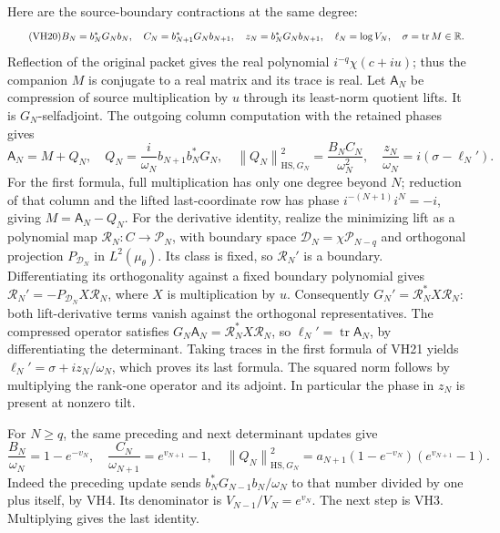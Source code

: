 \documentclass[11pt]{article}
\newcommand{\tr}{\operatorname{tr}}\newcommand{\norm}[1]{\left\lVert#1\right\rVert}
\begin{document}
Here are the source-boundary contractions at the same degree:
\begin{equation}\tag{VH20}\label{VH20}
B_N=b_N^*G_Nb_N,\quad C_N=b_{N+1}^*G_Nb_{N+1},\quad
z_N=b_N^*G_Nb_{N+1},\quad
\ell_N=\log V_N,\quad \sigma=\tr M\in\R.
\end{equation}
Reflection of the original packet gives the real polynomial
\(i^{-q}\chi(c+iu)\); thus the companion \(M\) is conjugate to a real
matrix and its trace is real. Let \(\mathsf A_N\) be compression of
source multiplication by \(u\) through its least-norm quotient lifts.
It is \(G_N\)-selfadjoint. The outgoing column computation with the
retained phases gives
\begin{equation}\tag{VH21}\label{VH21}
\mathsf A_N=M+Q_N,\quad
Q_N=\frac{i}{\omega_N}b_{N+1}b_N^*G_N,\quad
\norm{Q_N}_{\mathrm{HS},G_N}^2=\frac{B_NC_N}{\omega_N^2},\quad
\frac{z_N}{\omega_N}=i(\sigma-\ell_N').
\end{equation}
For the first formula, full multiplication has only one degree beyond
\(N\); reduction of that column and the lifted last-coordinate row
has phase \(i^{-(N+1)}i^N=-i\), giving \(M=\mathsf A_N-Q_N\).
For the derivative identity, realize the minimizing lift as a polynomial
map \(\mathcal R_N:C\to\mathcal P_N\), with boundary space
\(\mathcal D_N=\chi\mathcal P_{N-q}\) and orthogonal projection
\(P_{\mathcal D_N}\) in \(L^2(\mu_\theta)\). Its class is fixed, so
\(\mathcal R_N'\) is a boundary. Differentiating its orthogonality
against a fixed boundary polynomial gives
\(\mathcal R_N'=-P_{\mathcal D_N}X\mathcal R_N\), where \(X\) is
multiplication by \(u\). Consequently
\(G_N'=\mathcal R_N^*X\mathcal R_N\): both lift-derivative terms vanish
against the orthogonal representatives. The compressed operator satisfies
\(G_N\mathsf A_N=\mathcal R_N^*X\mathcal R_N\), so
\(\ell_N'=\tr\mathsf A_N\), by differentiating the determinant.
Taking traces in the first formula of VH21 yields
\(\ell_N'=\sigma+i z_N/\omega_N\), which proves its last formula.
The squared norm follows by multiplying the rank-one operator and its
adjoint. In particular the phase in \(z_N\) is present at nonzero tilt.

For \(N\ge q\), the same preceding and next determinant updates give
\begin{equation}\tag{VH22}\label{VH22}
\frac{B_N}{\omega_N}=1-e^{-v_N},\quad
\frac{C_N}{\omega_{N+1}}=e^{v_{N+1}}-1,\quad
\norm{Q_N}_{\mathrm{HS},G_N}^2
=a_{N+1}(1-e^{-v_N})(e^{v_{N+1}}-1).
\end{equation}
Indeed the preceding update sends
\(b_N^*G_{N-1}b_N/\omega_N\) to that number divided by one plus itself,
by VH4. Its denominator is \(V_{N-1}/V_N=e^{v_N}\).
The next step is VH3. Multiplying gives the last identity.
\end{document}
